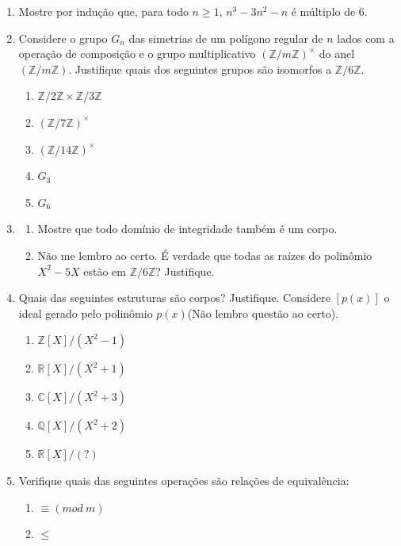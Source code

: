\begin{enumerate}[left=0.5cm, align=left, nosep]
    \item Mostre por indução que, para todo $n \geq 1$, $n^3 - 3n^2 - n$ é múltiplo de 6.

    \item Considere o grupo $G_n$ das simetrias de um polígono regular de $n$ lados com a operação de composição e o 
    grupo multiplicativo $(\mathbb{Z}/m\mathbb{Z})^{\times}$ do anel $(\mathbb{Z}/m\mathbb{Z})$. Justifique quais dos 
    seguintes grupos são isomorfos a $\mathbb{Z}/6\mathbb{Z}$.
    \begin{enumerate}[label=(\roman*), left=0.5cm, align=left, nosep]
        \item $\mathbb{Z}/2\mathbb{Z} \times \mathbb{Z}/3\mathbb{Z}$
        \item $(\mathbb{Z}/7\mathbb{Z})^{\times}$
        \item $(\mathbb{Z}/14\mathbb{Z})^{\times}$
        \item $G_3$
        \item $G_6$
    \end{enumerate}

    \item
    \begin{enumerate}[label=(\roman*), left=0.5cm, align=left, nosep]
        \item Mostre que todo domínio de integridade também é um corpo.
        \item Não me lembro ao certo. É verdade que todas as raízes do polinômio $X^2 - 5X$ estão em $\mathbb{Z}/6\mathbb{Z}$? Justifique.
    \end{enumerate}

    \item Quais das seguintes estruturas são corpos? Justifique. Considere $[p(x)]$ o ideal gerado pelo polinômio $p(x)$(Não lembro 
    questão ao certo).
    \begin{enumerate}[label=(\roman*), left=0.5cm, align=left, nosep]
        \item $\mathbb{Z}[X]/(X^2 - 1)$
        \item $\mathbb{R}[X]/(X^2 + 1)$
        \item $\mathbb{C}[X]/(X^2 + 3)$
        \item $\mathbb{Q}[X]/(X^2 + 2)$
        \item $\mathbb{R}[X]/(\text{?})$
    \end{enumerate}

    \item Verifique quais das seguintes operações são relações de equivalência:
    \begin{enumerate}[label=(\roman*), left=0.5cm, align=left, nosep]
        \item $\equiv (mod \ m)$
        \item $\leq$
    \end{enumerate}

\end{enumerate}
